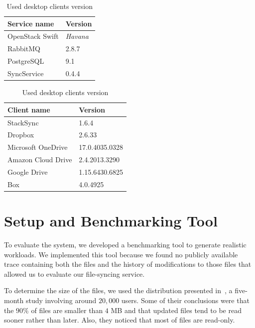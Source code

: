 \begin{table}[!htb]
    \begin{minipage}{.5\linewidth}
      \centering
        \begin{tabular}{ | l | l | }
    	\hline
    	Service name & Version \\ \hline
    	OpenStack Swift & \textit{Havana} \\
    	RabbitMQ & 2.8.7 \\
    	PostgreSQL & 9.1 \\
    	SyncService & 0.4.4 \\ \hline
    	\end{tabular}
    \caption{Used services version}
    \label{table:services}
    \end{minipage}%
    \begin{minipage}{.5\linewidth}
      \centering
        \begin{tabular}{ | l | l | }
    	\hline
    	Client name & Version \\ \hline
    	StackSync & 1.6.4 \\
    	Dropbox & 2.6.33 \\
    	Microsoft OneDrive & 17.0.4035.0328 \\
    	Amazon Cloud Drive & 2.4.2013.3290 \\ 
    	Google Drive & 1.15.6430.6825 \\ 
    	Box & 4.0.4925 \\ \hline
    	\end{tabular}
    \caption{Used desktop clients version}
    \label{table:clients}
    \end{minipage} 
\end{table}

\section{Setup and Benchmarking Tool}

To evaluate the system, we developed a benchmarking tool to generate
realistic workloads. We implemented this tool because we found no publicly available trace containing both 
the files and the history of modifications to those files that allowed us to evaluate our file-syncing service.

To determine the size of the files, we used the distribution presented in~\cite{liu2013},
a five-month study involving around $20,000$ users. Some of their conclusions
were that the $90\%$ of files are smaller than $4$ MB and that updated files tend to be read sooner
rather than later. Also, they noticed that most of files are read-only.

